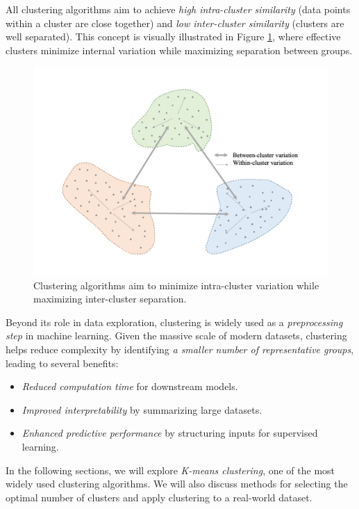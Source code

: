 \documentclass[
]{book}
\providecommand{\tightlist}{%
  \setlength{\itemsep}{0pt}\setlength{\parskip}{0pt}}
\theoremstyle{definition}
\theoremstyle{definition}
\theoremstyle{definition}
\theoremstyle{definition}
\theoremstyle{remark}
\begin{document}
All clustering algorithms aim to achieve \emph{high intra-cluster similarity} (data points within a cluster are close together) and \emph{low inter-cluster similarity} (clusters are well separated). This concept is visually illustrated in Figure \ref{fig:cluster-1}, where effective clusters minimize internal variation while maximizing separation between groups.

\begin{figure}

{\centering \includegraphics[width=0.75\linewidth]{images/cluster_1} 

}

\caption{Clustering algorithms aim to minimize intra-cluster variation while maximizing inter-cluster separation.}\label{fig:cluster-1}
\end{figure}

Beyond its role in data exploration, clustering is widely used as a \emph{preprocessing step} in machine learning. Given the massive scale of modern datasets, clustering helps reduce complexity by identifying \emph{a smaller number of representative groups}, leading to several benefits:

\begin{itemize}
\tightlist
\item
  \emph{Reduced computation time} for downstream models.\\
\item
  \emph{Improved interpretability} by summarizing large datasets.\\
\item
  \emph{Enhanced predictive performance} by structuring inputs for supervised learning.
\end{itemize}

In the following sections, we will explore \emph{K-means clustering}, one of the most widely used clustering algorithms. We will also discuss methods for selecting the optimal number of clusters and apply clustering to a real-world dataset.
\end{document}
